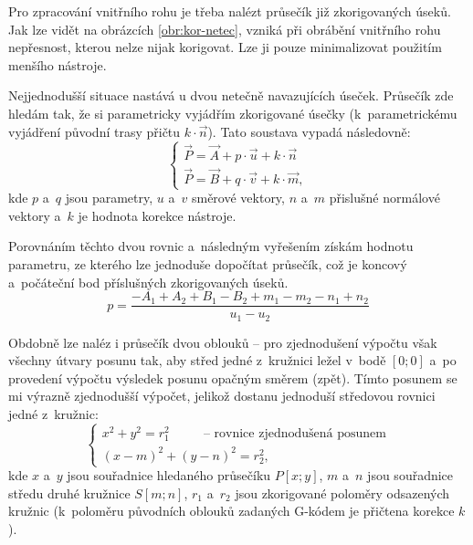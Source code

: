 			Pro zpracování vnitřního rohu je třeba nalézt průsečík již zkorigovaných úseků. Jak lze vidět na obrázcích \ref{obr:kor-netec}, vzniká při obrábění vnitřního rohu nepřesnost, kterou nelze nijak korigovat. Lze ji pouze minimalizovat použitím menšího nástroje.
			
			Nejjednodušší situace nastává u dvou netečně navazujících úseček. Průsečík zde hledám tak, že si parametricky vyjádřím zkorigované úsečky (k~parametrickému vyjádření původní trasy přičtu $k\cdot\vec{n}$). Tato soustava vypadá následovně:
			\begin{equation}
				\begin{cases}
				\vec{P}=\vec{A}+p\cdot\vec{u}+k\cdot\vec{n} \\
				\vec{P}=\vec{B}+q\cdot\vec{v}+k\cdot\vec{m},
				\end{cases}
			\end{equation}
			kde $p$ a~$q$ jsou parametry, $u$ a~$v$ směrové vektory, $n$ a~$m$ přislušné normálové vektory a~$k$ je hodnota korekce nástroje.
			
			Porovnáním těchto dvou rovnic a~následným vyřešením získám hodnotu parametru, ze kterého lze jednoduše dopočítat průsečík, což je koncový a~počáteční bod příslušných zkorigovaných úseků.
			\begin{equation}
				p=\frac{-A_1+A_2+B_1-B_2+m_1-m_2-n_1+n_2}{u_1-u_2}	
			\end{equation}
			
			Obdobně lze naléz i průsečík dvou oblouků -- pro zjednodušení výpočtu však všechny útvary posunu tak, aby střed jedné z~kružnici ležel v~bodě $[0;0]$ a~po provedení výpočtu výsledek posunu opačným směrem (zpět). Tímto posunem se mi výrazně zjednodušší výpočet, jelikož dostanu jednoduší středovou rovnici jedné z~kružnic:
			\begin{equation}
				\begin{cases}
				x^2+y^2=r_1^2 \text{~~~~~~~~--~rovnice zjednodušená posunem}\\
				(x-m)^2+(y-n)^2=r_2^2, 
				\end{cases}
			\end{equation}
			kde $x$ a~$y$ jsou souřadnice hledaného průsečíku $P[x;y]$, $m$ a~$n$ jsou  souřadnice středu druhé kružnice $S[m;n]$, $r_1$ a~$r_2$ jsou zkorigované poloměry odsazených kružnic (k~poloměru původních oblouků zadaných G-kódem je přičtena korekce $k$).
			
